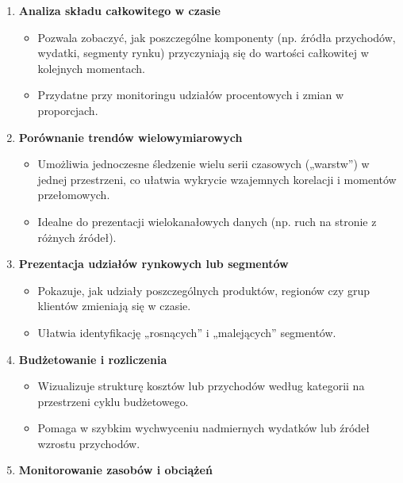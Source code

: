\documentclass[
  polish,
  letterpaper,
  DIV=11,
  numbers=noendperiod]{scrreprt}
\providecommand{\tightlist}{%
  \setlength{\itemsep}{0pt}\setlength{\parskip}{0pt}}
\begin{document}
\begin{enumerate}
\def\labelenumi{\arabic{enumi}.}
\tightlist
\item
  \textbf{Analiza składu całkowitego w czasie}

  \begin{itemize}
  \tightlist
  \item
    Pozwala zobaczyć, jak poszczególne komponenty (np. źródła
    przychodów, wydatki, segmenty rynku) przyczyniają się do wartości
    całkowitej w kolejnych momentach.\\
  \item
    Przydatne przy monitoringu udziałów procentowych i zmian w
    proporcjach.
  \end{itemize}
\item
  \textbf{Porównanie trendów wielowymiarowych}

  \begin{itemize}
  \tightlist
  \item
    Umożliwia jednoczesne śledzenie wielu serii czasowych („warstw'') w
    jednej przestrzeni, co ułatwia wykrycie wzajemnych korelacji i
    momentów przełomowych.\\
  \item
    Idealne do prezentacji wielokanałowych danych (np. ruch na stronie z
    różnych źródeł).
  \end{itemize}
\item
  \textbf{Prezentacja udziałów rynkowych lub segmentów}

  \begin{itemize}
  \tightlist
  \item
    Pokazuje, jak udziały poszczególnych produktów, regionów czy grup
    klientów zmieniają się w czasie.\\
  \item
    Ułatwia identyfikację „rosnących'' i „malejących'' segmentów.
  \end{itemize}
\item
  \textbf{Budżetowanie i rozliczenia}

  \begin{itemize}
  \tightlist
  \item
    Wizualizuje strukturę kosztów lub przychodów według kategorii na
    przestrzeni cyklu budżetowego.\\
  \item
    Pomaga w szybkim wychwyceniu nadmiernych wydatków lub źródeł wzrostu
    przychodów.
  \end{itemize}
\item
  \textbf{Monitorowanie zasobów i obciążeń}


\end{enumerate}
\end{document}
